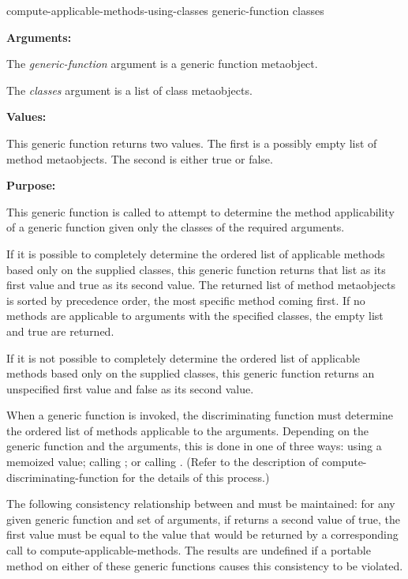 \begin{defun}
compute-applicable-methods-using-classes generic-function classes

\textbf{Arguments:}

The \emph{generic-function} argument is a generic function metaobject.

The \emph{classes} argument is a list of class metaobjects.

\textbf{Values:}

This generic function returns two values. The first is a possibly empty list of
method metaobjects. The second is either true or false.

\textbf{Purpose:}

This generic function is called to attempt to determine the method applicability
of a generic function given only the classes of the required arguments.

If it is possible to completely determine the ordered list of applicable methods
based only on the supplied classes, this generic function returns that list as
its first value and true as its second value. The returned list of method
metaobjects is sorted by precedence order, the most specific method coming
first. If no methods are applicable to arguments with the specified classes, the
empty list and true are returned.

If it is not possible to completely determine the ordered list of applicable
methods based only on the supplied classes, this generic function returns an
unspecified first value and false as its second value.

When a generic function is invoked, the discriminating function must determine
the ordered list of methods applicable to the arguments. Depending on the
generic function and the arguments, this is done in one of three ways: using a
memoized value; calling ; or calling
. (Refer to the description of
compute-discriminating-function for the details of this process.)

The following consistency relationship between
 and  must be
maintained: for any given generic function and set of arguments, if
 returns a second value of true, the
first value must be equal to the value that would be returned by a corresponding
call to compute-applicable-methods. The results are undefined if a portable
method on either of these generic functions causes this consistency to be
violated.


\end{defun}
